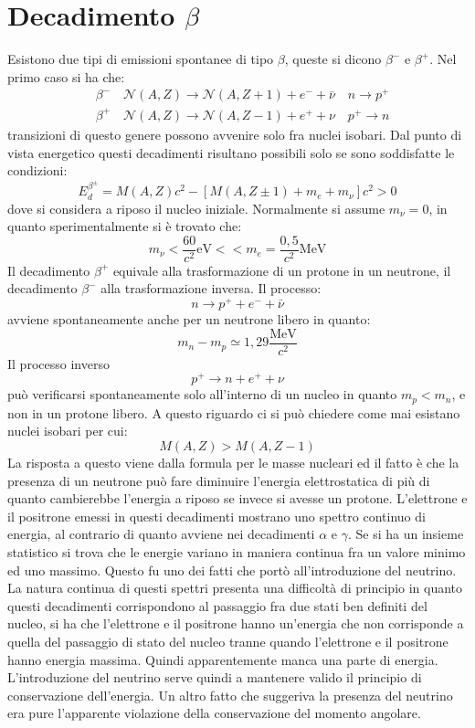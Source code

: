 \section{Decadimento $\beta$}
Esistono due tipi di emissioni spontanee di tipo $\beta$, queste si dicono $\beta^-$ e $\beta^+$.
Nel primo caso si ha che:
\begin{align*}
&\beta^-\quad \mathcal{N}(A,Z)\rightarrow\mathcal{N}(A,Z+1)+e^-+\bar{\nu}\quad n\rightarrow p^+\\
&\beta^+\quad \mathcal{N}(A,Z)\rightarrow\mathcal{N}(A,Z-1)+e^++\nu\quad p^+\rightarrow n
\end{align*}
transizioni di questo genere possono avvenire solo fra nuclei isobari.
Dal punto di vista energetico questi decadimenti risultano possibili solo se sono soddisfatte le condizioni:
\[
E_d^{\beta^{\pm}}=M(A,Z)c^2-[M(A,Z\pm1)+m_e+m_{\nu}]c^2>0
\]
dove si considera a riposo il nucleo iniziale. Normalmente si assume $m_{\nu}=0$, in quanto sperimentalmente si è trovato che:
\[
m_{\nu}<\frac{60}{c^2}\si{\electronvolt}<<m_e=\frac{0,5}{c^2}\si{\mega\electronvolt}
\]
Il decadimento $\beta^+$ equivale alla trasformazione di un protone in un neutrone, il decadimento $\beta^-$ alla trasformazione inversa.
Il processo:
\[
n\rightarrow p^++e^-+\bar{\nu}
\]
avviene spontaneamente anche per un neutrone libero in quanto:
\[
m_n-m_p\simeq1,29\frac{\si{\mega\electronvolt}}{c^2}
\]
Il processo inverso
\[
p^+\rightarrow n+e^++\nu
\]
può verificarsi spontaneamente solo all'interno di un nucleo in quanto $m_p<m_n$, e non in un protone libero. A questo riguardo ci si può chiedere
come mai esistano nuclei isobari per cui:
\[
M(A,Z)>M(A,Z-1)
\]
La risposta a questo viene dalla formula  per le masse nucleari ed il fatto è che la presenza di un neutrone può fare diminuire l'energia elettrostatica di più di
quanto cambierebbe l'energia a riposo se invece si avesse un protone. L'elettrone e il positrone emessi in questi decadimenti mostrano uno spettro continuo di energia,
al contrario di quanto avviene nei decadimenti $\alpha$ e $\gamma$. Se si ha un insieme statistico si trova che le energie variano in maniera continua fra un valore minimo
ed uno massimo. Questo fu uno dei fatti che portò all'introduzione del neutrino. La natura continua di questi spettri presenta una difficoltà di principio in quanto
questi decadimenti corrispondono al passaggio fra due stati ben definiti del nucleo, si ha che l'elettrone e il positrone hanno un'energia che non
corrisponde a quella del passaggio di stato del nucleo tranne quando l'elettrone e il positrone hanno energia massima.
Quindi apparentemente manca una parte di energia. L'introduzione del neutrino serve quindi a mantenere valido il principio di conservazione dell'energia.
Un altro fatto che suggeriva la presenza del neutrino era pure l'apparente violazione della conservazione del momento angolare.

